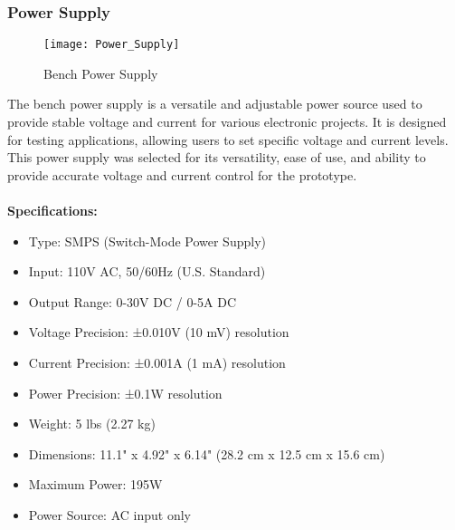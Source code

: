 \subsubsection{Power Supply}
\begin{figure}[!htbp]
	\centering
	\texttt{[image: Power\_Supply]}
	\caption{Bench Power Supply}
	\label{fig:Power_Supply_fig}
\end{figure}
The bench power supply is a versatile and adjustable power source used to 
provide stable voltage and current for various electronic projects.
It is designed for testing applications, allowing users to set specific voltage and current levels.
This power supply was selected for its versatility, 
ease of use, and ability to provide accurate voltage and current control for the prototype.
\\
\\
\textbf{Specifications:}
\begin{itemize}
    \item Type: SMPS (Switch-Mode Power Supply)
    \item Input: 110V AC, 50/60Hz (U.S. Standard)
    \item Output Range: 0-30V DC / 0-5A DC
    \item Voltage Precision: ±0.010V (10 mV) resolution
    \item Current Precision: ±0.001A (1 mA) resolution
    \item Power Precision: ±0.1W resolution
    \item Weight: 5 lbs (2.27 kg)
    \item Dimensions: 11.1" x 4.92" x 6.14" (28.2 cm x 12.5 cm x 15.6 cm)
    \item Maximum Power: 195W
    \item Power Source: AC input only
\end{itemize}

